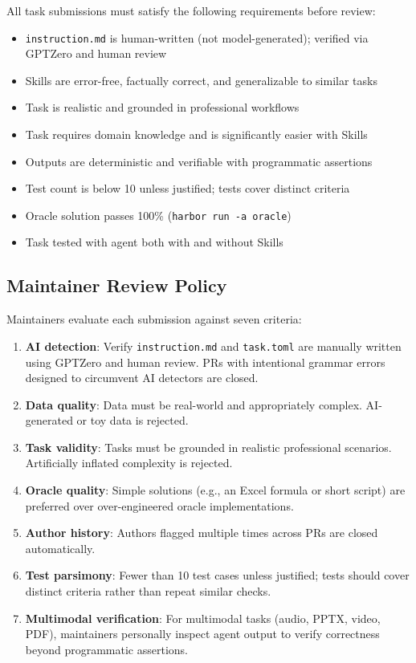 All task submissions must satisfy the following requirements before review:
\begin{itemize}[nosep]
\item[$\square$] \texttt{instruction.md} is human-written (not model-generated); verified via GPTZero and human review
\item[$\square$] Skills are error-free, factually correct, and generalizable to similar tasks
\item[$\square$] Task is realistic and grounded in professional workflows
\item[$\square$] Task requires domain knowledge and is significantly easier with Skills
\item[$\square$] Outputs are deterministic and verifiable with programmatic assertions
\item[$\square$] Test count is below 10 unless justified; tests cover distinct criteria
\item[$\square$] Oracle solution passes 100\% (\texttt{harbor run -a oracle})
\item[$\square$] Task tested with agent both with and without Skills
\end{itemize}

\subsection{Maintainer Review Policy}

Maintainers evaluate each submission against seven criteria:
\begin{enumerate}[nosep]
\item \textbf{AI detection}: Verify \texttt{instruction.md} and \texttt{task.toml} are manually written using GPTZero and human review. PRs with intentional grammar errors designed to circumvent AI detectors are closed.
\item \textbf{Data quality}: Data must be real-world and appropriately complex. AI-generated or toy data is rejected.
\item \textbf{Task validity}: Tasks must be grounded in realistic professional scenarios. Artificially inflated complexity is rejected.
\item \textbf{Oracle quality}: Simple solutions (e.g., an Excel formula or short script) are preferred over over-engineered oracle implementations.
\item \textbf{Author history}: Authors flagged multiple times across PRs are closed automatically.
\item \textbf{Test parsimony}: Fewer than 10 test cases unless justified; tests should cover distinct criteria rather than repeat similar checks.
\item \textbf{Multimodal verification}: For multimodal tasks (audio, PPTX, video, PDF), maintainers personally inspect agent output to verify correctness beyond programmatic assertions.
\end{enumerate}

